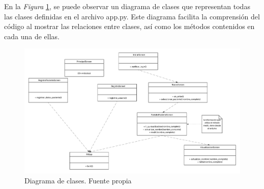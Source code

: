 En la \textit{Figura} \ref{fig:Diagrama_de_clases}, se puede observar un diagrama de clases que representan todas las clases definidas en el archivo app.py. Este diagrama facilita la comprensión del código al mostrar las relaciones entre clases, así como los métodos contenidos en cada una de ellas.
\begin{figure}
    \centering
    \includegraphics[width=1.35\linewidth]{img/Diagrama de clases.png}
    \caption{Diagrama de clases. Fuente propia}
    \label{fig:Diagrama_de_clases}
\end{figure}